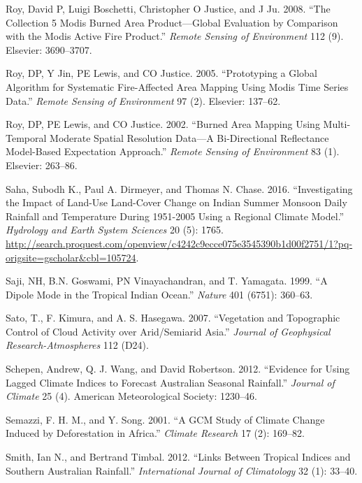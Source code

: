\documentclass[fleqn,10pt,lineno]{wlpeerj} %
\begin{document}
\hypertarget{ref-Roy2008}{}
Roy, David P, Luigi Boschetti, Christopher O Justice, and J Ju. 2008.
``The Collection 5 Modis Burned Area Product---Global Evaluation by
Comparison with the Modis Active Fire Product.'' \emph{Remote Sensing of
Environment} 112 (9). Elsevier: 3690--3707.

\hypertarget{ref-Roy2005}{}
Roy, DP, Y Jin, PE Lewis, and CO Justice. 2005. ``Prototyping a Global
Algorithm for Systematic Fire-Affected Area Mapping Using Modis Time
Series Data.'' \emph{Remote Sensing of Environment} 97 (2). Elsevier:
137--62.

\hypertarget{ref-Roy2002}{}
Roy, DP, PE Lewis, and CO Justice. 2002. ``Burned Area Mapping Using
Multi-Temporal Moderate Spatial Resolution Data---A Bi-Directional
Reflectance Model-Based Expectation Approach.'' \emph{Remote Sensing of
Environment} 83 (1). Elsevier: 263--86.

\hypertarget{ref-saha_investigating_2016}{}
Saha, Subodh K., Paul A. Dirmeyer, and Thomas N. Chase. 2016.
``Investigating the Impact of Land-Use Land-Cover Change on Indian
Summer Monsoon Daily Rainfall and Temperature During 1951-2005 Using a
Regional Climate Model.'' \emph{Hydrology and Earth System Sciences} 20
(5): 1765.
\url{http://search.proquest.com/openview/c4242c9ecce075e3545390b1d00f2751/1?pq-origsite=gscholar\&cbl=105724}.

\hypertarget{ref-Saji1999}{}
Saji, NH, B.N. Goswami, PN Vinayachandran, and T. Yamagata. 1999. ``A
Dipole Mode in the Tropical Indian Ocean.'' \emph{Nature} 401 (6751):
360--63.

\hypertarget{ref-Sato2007}{}
Sato, T., F. Kimura, and A. S. Hasegawa. 2007. ``Vegetation and
Topographic Control of Cloud Activity over Arid/Semiarid Asia.''
\emph{Journal of Geophysical Research-Atmospheres} 112 (D24).

\hypertarget{ref-Schepen2012}{}
Schepen, Andrew, Q. J. Wang, and David Robertson. 2012. ``Evidence for
Using Lagged Climate Indices to Forecast Australian Seasonal Rainfall.''
\emph{Journal of Climate} 25 (4). American Meteorological Society:
1230--46.

\hypertarget{ref-Semazzi2001}{}
Semazzi, F. H. M., and Y. Song. 2001. ``A GCM Study of Climate Change
Induced by Deforestation in Africa.'' \emph{Climate Research} 17 (2):
169--82.

\hypertarget{ref-Smith2012}{}
Smith, Ian N., and Bertrand Timbal. 2012. ``Links Between Tropical
Indices and Southern Australian Rainfall.'' \emph{International Journal
of Climatology} 32 (1): 33--40.
\end{document}
